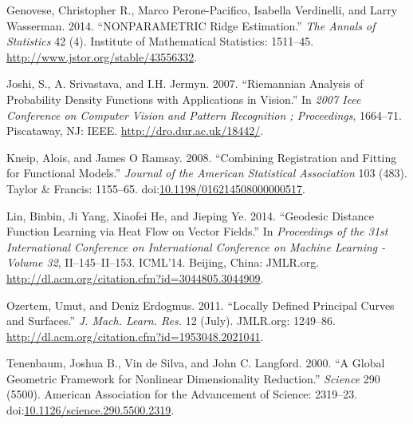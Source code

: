 \hypertarget{ref-Genovese2014}{}
Genovese, Christopher R., Marco Perone-Pacifico, Isabella Verdinelli,
and Larry Wasserman. 2014. ``NONPARAMETRIC Ridge Estimation.'' \emph{The
Annals of Statistics} 42 (4). Institute of Mathematical Statistics:
1511--45. \url{http://www.jstor.org/stable/43556332}.

\hypertarget{ref-Joshi2007}{}
Joshi, S., A. Srivastava, and I.H. Jermyn. 2007. ``Riemannian Analysis
of Probability Density Functions with Applications in Vision.'' In
\emph{2007 Ieee Conference on Computer Vision and Pattern Recognition ;
Proceedings}, 1664--71. Piscataway, NJ: IEEE.
\url{http://dro.dur.ac.uk/18442/}.

\hypertarget{ref-Kneip2008}{}
Kneip, Alois, and James O Ramsay. 2008. ``Combining Registration and
Fitting for Functional Models.'' \emph{Journal of the American
Statistical Association} 103 (483). Taylor \& Francis: 1155--65.
doi:\href{https://doi.org/10.1198/016214508000000517}{10.1198/016214508000000517}.

\hypertarget{ref-Lin2014}{}
Lin, Binbin, Ji Yang, Xiaofei He, and Jieping Ye. 2014. ``Geodesic
Distance Function Learning via Heat Flow on Vector Fields.'' In
\emph{Proceedings of the 31st International Conference on International
Conference on Machine Learning - Volume 32}, II--145--II--153. ICML'14.
Beijing, China: JMLR.org.
\url{http://dl.acm.org/citation.cfm?id=3044805.3044909}.

\hypertarget{ref-Ozertem2011}{}
Ozertem, Umut, and Deniz Erdogmus. 2011. ``Locally Defined Principal
Curves and Surfaces.'' \emph{J. Mach. Learn. Res.} 12 (July). JMLR.org:
1249--86. \url{http://dl.acm.org/citation.cfm?id=1953048.2021041}.

\hypertarget{ref-Tenenbaum2000}{}
Tenenbaum, Joshua B., Vin de Silva, and John C. Langford. 2000. ``A
Global Geometric Framework for Nonlinear Dimensionality Reduction.''
\emph{Science} 290 (5500). American Association for the Advancement of
Science: 2319--23.
doi:\href{https://doi.org/10.1126/science.290.5500.2319}{10.1126/science.290.5500.2319}.
